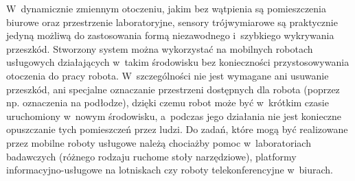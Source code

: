 W~dynamicznie zmiennym otoczeniu, jakim bez wątpienia są pomieszczenia biurowe oraz
przestrzenie laboratoryjne, sensory trójwymiarowe są praktycznie jedyną możliwą do
zastosowania formą niezawodnego i~szybkiego wykrywania przeszkód. Stworzony system
można wykorzystać na mobilnych robotach usługowych działających w~takim środowisku
bez konieczności przystosowywania otoczenia do pracy robota. W~szczególności nie jest
wymagane ani usuwanie przeszkód, ani specjalne oznaczanie przestrzeni dostępnych dla
robota (poprzez np. oznaczenia na podłodze), dzięki czemu robot może być w~krótkim
czasie uruchomiony w~nowym środowisku, a~podczas jego działania nie jest konieczne
opuszczanie tych pomieszczeń przez ludzi. Do zadań, które mogą być realizowane przez
mobilne roboty usługowe należą chociażby pomoc w~laboratoriach badawczych (różnego
rodzaju ruchome stoły narzędziowe), platformy informacyjno-usługowe na lotniskach
czy roboty telekonferencyjne w~biurach.
